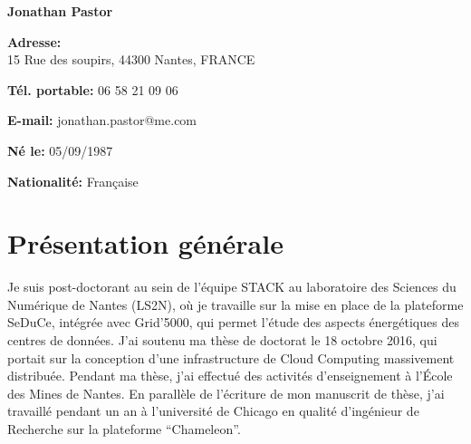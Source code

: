 \documentclass[french,11pt,a4paper]{moderncv}
\begin{document}
\makecvtitle

\vspace{-1.3cm}

\textbf{Jonathan Pastor}

\vspace{5mm} %

\textbf{Adresse:}
\\
15 Rue des soupirs, 44300 Nantes, FRANCE

\textbf{Tél. portable:} 06 58 21 09 06

\textbf{E-mail:} jonathan.pastor@me.com

\textbf{Né le:} 05/09/1987

\textbf{Nationalité:} Française

\section{Présentation générale}

Je suis post-doctorant au sein de l'équipe STACK au laboratoire des
Sciences du Numérique de Nantes (LS2N), où je travaille sur la mise en
place de la plateforme SeDuCe, intégrée avec Grid'5000, qui permet
l'étude des aspects énergétiques des centres de données. J'ai soutenu
ma thèse de doctorat le 18 octobre 2016, qui portait sur la conception
d'une infrastructure de Cloud Computing massivement
distribuée. Pendant ma thèse, j'ai effectué des activités
d'enseignement à l'École des Mines de Nantes. En parallèle de
l'écriture de mon manuscrit de thèse, j'ai travaillé pendant un an à
l'université de Chicago en qualité d'ingénieur de Recherche sur la
plateforme ``Chameleon''.



\end{document}
